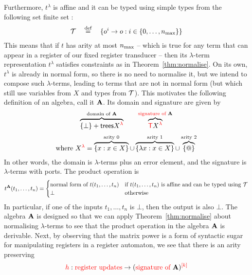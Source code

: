 Furthermore, $t^\lambda$ is affine and it can be typed using simple types  from  the following set finite set :
\begin{align*}
    \Tt \quad \eqdef \quad \set{\otype^i \to \otype : i \in \set{0,\ldots,\nmax}}
\end{align*}
This means that if $t$ has arity at most $\nmax$ -- which is true for any term that can appear in a register of our fixed register transducer -- then its $\lambda$-term representation $t^\lambda$ satisfies constraints as in Theorem~\ref{thm:normalise}.  On its own, $t^\lambda$ is already in normal form, so there is no need to normalise it, but we intend to compose  such $\lambda$-terms, leading to terms that are not in normal form (but which still use variables from $X$ and types from $\Tt$). 
This motivates the  following definition of an algebra, call it $\alg$. Its domain and signature are given by 
\begin{align*}
\overbrace{\set \bot + \trees \lamrank X}^{\algdom \alg}  \qquad \overbrace{ \tmonad \lamrank X}^{\algops \alg} 
\end{align*}
\begin{align*}
\text{where }\lamrank X = {\overbrace{\set{x : x \in X}}^{\text{arity 0}} \cup \overbrace{\set{\lambda x : x \in X}}^{\text{arity 1}} \cup  \overbrace{\set @}^{\text{arity 2}}}
\end{align*}
In other words, the domain is $\lambda$-terms plus an error element, and the signature is $\lambda$-terms  with ports. The   product operation is 
\begin{align*}
t^\alg(t_1,\ldots,t_n) = \begin{cases}
    \text{normal form of $t(t_1,\ldots,t_n)$} & \text{if $t(t_1,\ldots,t_n)$ is affine and can be typed using $\Tt$}\\
    \bot & \text{otherwise}
\end{cases}
\end{align*}
In particular, if one of the inputs $t_1,\ldots,t_n$ is $\bot$, then the output is also $\bot$.  The algebra $\alg$ is designed so that we can apply Theorem~\ref{thm:normalise} about normalising $\lambda$-terms to see that the  product operation in the  algebra $\alg$ is derivable. Next, by observing that the matrix power is a form of syntactic sugar for manipulating registers in a register automaton, we see that there is an arity preserving 
    \begin{align*}
    \ranked h : \regups \to \mati k {(\algops \alg)}
    \end{align*}
